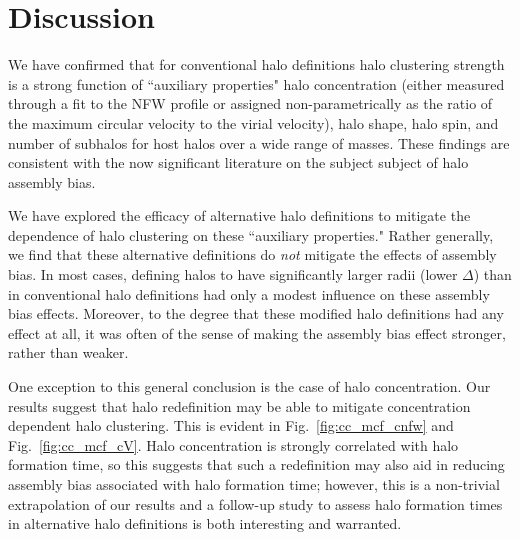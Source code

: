 \documentclass[usenatbib,usegraphicx,letterpaper]{mn2e}
\begin{document}
\section{Discussion}
\label{section:discussion}


We have confirmed that for conventional halo definitions 
halo clustering strength is a strong function of ``auxiliary properties" halo concentration (either measured
through a fit to the NFW profile or assigned non-parametrically as the ratio of the maximum circular velocity to
the virial velocity), halo shape, halo spin, and number of subhalos 
for host halos over a wide range of masses. These findings are consistent 
with the now significant literature on the subject subject of halo assembly bias. \citep{peacock00, wechsler02,
sheth04, gao05, zentner05, allgood06, harker06, wechsler06, croton07, dalal08, mao15, sunayama16}

We have explored the efficacy of alternative halo definitions to mitigate the dependence of halo 
clustering on these ``auxiliary properties." Rather generally, we find that these alternative definitions 
do {\em not} mitigate the effects of assembly bias. In most cases, defining halos to have significantly 
larger radii (lower $\Delta$) than in conventional halo definitions had only a modest influence on 
these assembly bias effects. Moreover, to the degree that these modified halo definitions had 
any effect at all, it was often of the sense of 
making the assembly bias effect stronger, rather than weaker. 

One exception to this general conclusion is the case of halo concentration. 
Our results suggest that halo redefinition may be able to mitigate concentration 
dependent halo clustering. This is evident in Fig.~\ref{fig:cc_mcf_cnfw} and 
Fig.~\ref{fig:cc_mcf_cV}. Halo concentration is strongly correlated with halo formation 
time, so this suggests that such a redefinition may also aid in reducing assembly bias 
associated with halo formation time; however, this is a non-trivial extrapolation of our 
results and a follow-up study to assess halo formation times in alternative halo definitions 
is both interesting and warranted. 
\end{document}
